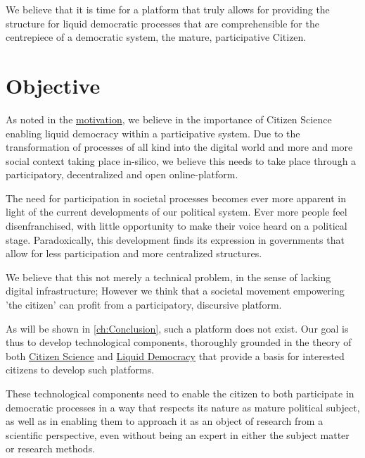 We believe that it is time for a platform that truly allows for providing the structure for liquid democratic processes that are comprehensible for the centrepiece of a democratic system, the mature, participative Citizen.


\section{Objective}
\label{sec:Objective}


As noted in the \hyperref[sec:Motivation]{motivation}, we believe in the importance of Citizen Science enabling liquid democracy within a participative system. Due to the transformation of processes of all kind into the digital world and more and more social context taking place in-silico, we believe this needs to take place through a participatory, decentralized and open online-platform.

The need for participation in societal processes becomes ever more apparent in light of the current developments of our political system. Ever more people feel disenfranchised, with little opportunity to make their voice heard on a political stage. Paradoxically, this development finds its expression in governments that allow for less participation and more centralized structures.

We believe that this not merely a technical problem, in the sense of lacking digital infrastructure; However we think that a societal movement empowering 'the citizen' can profit from a participatory, discursive platform.

As will be shown in \ref{ch:Conclusion}, such a platform does not exist. Our goal is thus to develop technological components, thoroughly grounded in the theory of both \hyperref[sec:Theory_CS]{Citizen Science} and \hyperref[sec:Liquid_Democracy]{Liquid Democracy} that provide a basis for interested citizens to develop such platforms.

These technological components need to enable the citizen to both participate in democratic processes in a way that respects its nature as mature political subject, as well as in enabling them to approach it as an object of research from a scientific perspective, even without being an expert in either the subject matter or research methods. 

